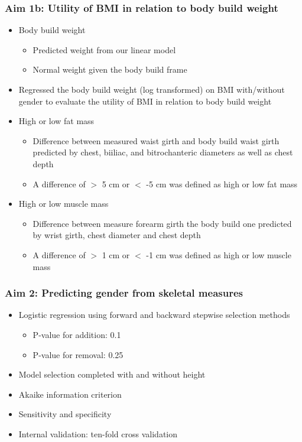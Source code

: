 \documentclass{beamer}
\begin{document}
\begin{frame}
\frametitle{Aim 1b: Utility of BMI in relation to body build weight}

\begin{itemize}
	\item Body build weight
	 	\begin{itemize}
	 		\item Predicted weight from our linear model
	 		\item Normal weight given the body build frame
	 	\end{itemize}	
	\item Regressed the body build weight (log transformed) on BMI with/without gender to evaluate the utility of BMI in relation to body build weight
	\item High or low fat mass
		\begin{itemize}
			\item Difference between measured waist girth and body build waist girth predicted by chest, biiliac, and bitrochanteric diameters as well as chest depth
			\item A difference of $>$ 5 cm or $<$ -5 cm was defined as high or low fat mass
		\end{itemize}	
	\item High or low muscle mass
		\begin{itemize}
			\item Difference between measure forearm girth the body build one predicted by wrist girth, chest diameter and chest depth
			\item A difference of $>$ 1 cm or $<$ -1 cm was defined as high or low muscle mass
		\end{itemize}	
\end{itemize}

\end{frame}

\begin{frame}
\frametitle{Aim 2: Predicting gender from skeletal measures}

\begin{itemize}
	\item Logistic regression using forward and backward stepwise selection methods
	\begin{itemize}
		\item P-value for addition: 0.1
		\item P-value for removal: 0.25
	\end{itemize}
	\item Model selection completed with and without height
	\item Akaike information criterion
	\item Sensitivity and specificity
	\item Internal validation: ten-fold cross validation
	
\end{itemize}

\end{frame}
\end{document}
